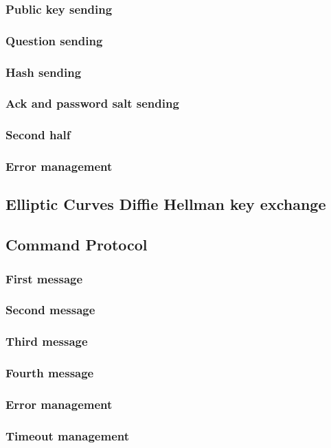 \documentclass[a4paper,12pt]{article}
\begin{document}
			\subsubsection{Public key sending}
			\subsubsection{Question sending}
			\subsubsection{Hash sending}
			\subsubsection{Ack and password salt sending}
			\subsubsection{Second half}
			\subsubsection{Error management}
		\subsection{Elliptic Curves Diffie Hellman key exchange}
		\subsection{Command Protocol}
			\subsubsection{First message}
			\subsubsection{Second message}
			\subsubsection{Third message}
			\subsubsection{Fourth message}
			\subsubsection{Error management}
			\subsubsection{Timeout management}
\end{document}
